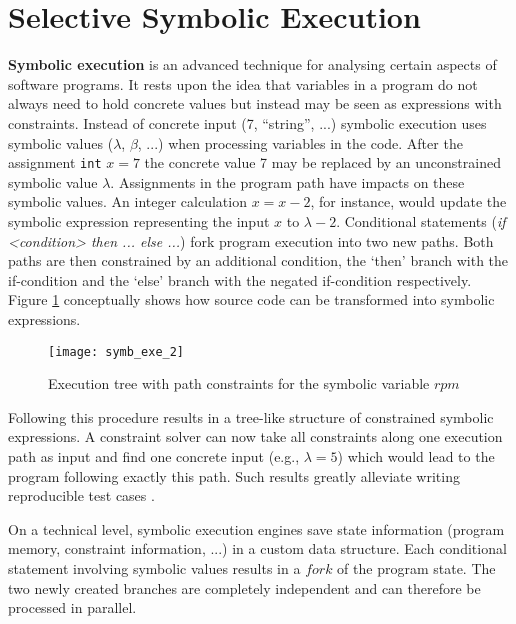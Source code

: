 \section{Selective Symbolic Execution}\label{sec:s2e}



\textbf{Symbolic execution} is an advanced technique for analysing certain aspects of software programs.
It rests upon the idea that variables in a program do not always need to hold concrete values but instead may be seen as expressions with constraints.
Instead of concrete input (7, ``string'', ...) symbolic execution uses symbolic values ($\lambda$, $\beta$, ...) when processing variables in the code. After the assignment \texttt{int} $x = 7$ the concrete value 7 may be replaced by an unconstrained symbolic value $\lambda$.
Assignments in the program path have impacts on these symbolic values.
An integer calculation $x = x - 2$, for instance, would update the symbolic expression representing the input $x$ to $\lambda - 2$.
Conditional statements (\textit{if <condition> then ... else ...}) fork program execution into two new paths.
Both paths are then constrained by an additional condition, the `then' branch with the if-condition and the `else' branch with the negated if-condition respectively.
Figure \ref{fig:introex} conceptually shows how source code can be transformed into symbolic expressions.


\begin{figure}
\texttt{[image: symb\_exe\_2]}
\caption{Execution tree with path constraints for the symbolic variable $rpm$ \cite{chip14s2e}}
\label{fig:introex}
\end{figure}

Following this procedure results in a tree-like structure of constrained symbolic expressions.
A constraint solver can now take all constraints along one execution path as input and find one concrete input (e.g., $\lambda = 5$) which would lead to the program following exactly this path.
Such results greatly alleviate writing reproducible test cases \cite{chip09sel}.

On a technical level, symbolic execution engines save state information (program memory, constraint information, ...) in a custom data structure.
Each conditional statement involving symbolic values results in a $fork$ of the program state.
The two newly created branches are completely independent and can therefore be processed in parallel.

